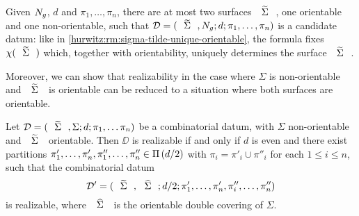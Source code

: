 \begin{remark}\label{hurwitz:rm:sigma-tilde-unique-non-orientable}
Given $N_{g}$, $d$ and $\pi_1,\ldots,\pi_n$, there are at most two surfaces $\tSigma$, one orientable and one non-orientable, such that $\DD=\datum{\tSigma,\nosurf{g}}{d}{\pi_1,\ldots,\pi_n}$ is a candidate datum: like in \cref{hurwitz:rm:sigma-tilde-unique-orientable}, the \RH{} formula fixes $\chi(\tSigma)$ which, together with orientability, uniquely determines the surface $\tSigma$.
\end{remark}

Moreover, we can show that realizability in the case where $\Sigma$ is non-orientable and $\tSigma$ is orientable can be reduced to a situation where both surfaces are orientable.

\begin{proposition}\label{hurwitz:th:monodromy-realizability-double-covering}
Let $\DD=\datum{\tSigma,\Sigma}{d}{\pi_1,\ldots\pi_n}$ be a combinatorial datum, with $\Sigma$ non-orientable and $\tSigma$ orientable. Then $\DD$ is realizable if and only if $d$ is even and there exist partitions $\pi'_1,\ldots,\pi'_n,\pi''_1,\ldots,\pi''_n\in\Pi\left(d/2\right)$ with $\pi_i=\pi'_i\cup\pi''_i$ for each $1\le i\le n$, such that the combinatorial datum
\[
\DD'=\datum{\tSigma,\hSigma}{d/2}{\pi'_1,\ldots,\pi'_n,\pi''_i,\ldots,\pi''_n}
\]
is realizable, where $\hSigma$ is the orientable double covering of $\Sigma$.
\end{proposition}
